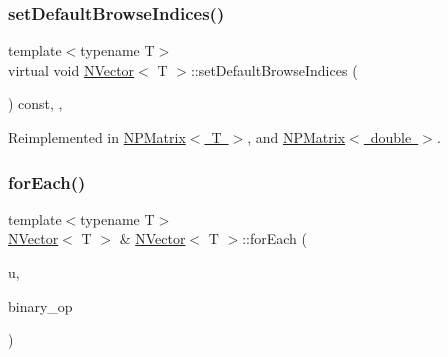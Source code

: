 \subsubsection{\texorpdfstring{setDefaultBrowseIndices()}{setDefaultBrowseIndices()}}
{\footnotesize\ttfamily template$<$typename T$>$ \\
virtual void \mbox{\hyperlink{class_n_vector}{N\+Vector}}$<$ T $>$\+::set\+Default\+Browse\+Indices (\begin{DoxyParamCaption}{ }\end{DoxyParamCaption}) const\hspace{0.3cm}{\ttfamily [inline]}, {\ttfamily [protected]}, {\ttfamily [virtual]}}



Reimplemented in \mbox{\hyperlink{class_n_p_matrix_a58e138e518c03a4f9751fafdf7e43bcb}{N\+P\+Matrix$<$ T $>$}}, and \mbox{\hyperlink{class_n_p_matrix_a58e138e518c03a4f9751fafdf7e43bcb}{N\+P\+Matrix$<$ double $>$}}.

\mbox{\label{class_n_vector_a703e598ebcdf39c8f0efa5c619a88d71}} 
\subsubsection{\texorpdfstring{forEach()}{forEach()}\hspace{0.1cm}{\footnotesize\ttfamily [1/2]}}
{\footnotesize\ttfamily template$<$typename T$>$ \\
\mbox{\hyperlink{class_n_vector}{N\+Vector}}$<$ T $>$ \& \mbox{\hyperlink{class_n_vector}{N\+Vector}}$<$ T $>$\+::for\+Each (\begin{DoxyParamCaption}\item[{const \mbox{\hyperlink{class_n_vector}{N\+Vector}}$<$ T $>$ \&}]{u,  }\item[{const std\+::function$<$ void(T \&, const T \&)$>$ \&}]{binary\+\_\+op }\end{DoxyParamCaption})\hspace{0.3cm}{\ttfamily [protected]}}

\mbox{\label{class_n_vector_af5cd7c64bfd8eb2335f61d698d6dbf21}} 
